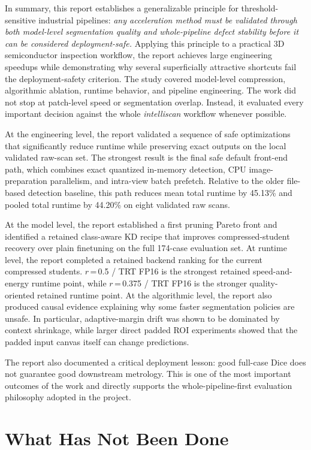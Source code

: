 In summary, this report establishes a generalizable principle for
threshold-sensitive industrial pipelines: \emph{any acceleration method
must be validated through both model-level segmentation quality and
whole-pipeline defect stability before it can be considered
deployment-safe.} Applying this principle to a practical 3D
semiconductor inspection workflow, the report achieves large engineering
speedups while demonstrating why several superficially attractive
shortcuts fail the deployment-safety criterion. The
study covered model-level compression, algorithmic ablation, runtime
behavior, and pipeline engineering. The work did not stop at patch-level
speed or segmentation overlap. Instead, it evaluated every important
decision against the whole \emph{intelliscan} workflow whenever
possible.

At the engineering level, the report validated a sequence of safe
optimizations that significantly reduce runtime while preserving exact
outputs on the local validated raw-scan set. The strongest result is the
final safe default front-end path, which combines exact quantized
in-memory detection, CPU image-preparation parallelism, and intra-view
batch prefetch. Relative to the older file-based detection baseline,
this path reduces mean total runtime by 45.13\% and pooled
total runtime by 44.20\% on eight validated raw scans.

At the model level, the report established a first pruning Pareto front
and identified a retained class-aware KD recipe that improves
compressed-student recovery over plain finetuning on the full
174-case evaluation set. At runtime level, the report completed
a retained backend ranking for the current compressed students.
$r$\,=\,0.5 / TRT FP16 is the strongest retained speed-and-energy
runtime point, while $r$\,=\,0.375 / TRT FP16 is the stronger
quality-oriented retained runtime point. At the algorithmic level, the
report also produced causal evidence explaining why some faster
segmentation policies are unsafe. In particular, adaptive-margin drift
was shown to be dominated by context shrinkage, while larger direct
padded ROI experiments showed that the padded input canvas itself can
change predictions.

The report also documented a critical deployment lesson: good full-case
Dice does not guarantee good downstream metrology. This is one of the
most important outcomes of the work and directly supports the
whole-pipeline-first evaluation philosophy adopted in the project.

\hypertarget{what-has-not-been-done}{%
\section{What Has Not Been Done}\label{what-has-not-been-done}}

